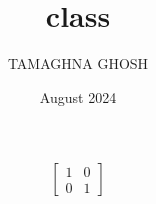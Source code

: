 \documentclass{article}
\title{class}
\author{TAMAGHNA GHOSH}
\date{August 2024}
\begin{document}
\maketitle

\[
\begin{bmatrix}
1 & 0 \\
0 & 1
\end{bmatrix}
\]
\end{document}

